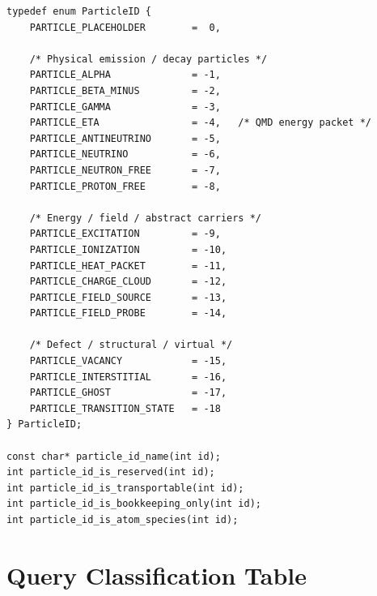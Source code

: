 \documentclass[11pt,a4paper]{article}
\begin{document}
\begin{lstlisting}[style=clang,
  caption={\texttt{legacy/c\_api/particle\_ids.h} -- updated C enum}]
typedef enum ParticleID {
    PARTICLE_PLACEHOLDER        =  0,

    /* Physical emission / decay particles */
    PARTICLE_ALPHA              = -1,
    PARTICLE_BETA_MINUS         = -2,
    PARTICLE_GAMMA              = -3,
    PARTICLE_ETA                = -4,   /* QMD energy packet */
    PARTICLE_ANTINEUTRINO       = -5,
    PARTICLE_NEUTRINO           = -6,
    PARTICLE_NEUTRON_FREE       = -7,
    PARTICLE_PROTON_FREE        = -8,

    /* Energy / field / abstract carriers */
    PARTICLE_EXCITATION         = -9,
    PARTICLE_IONIZATION         = -10,
    PARTICLE_HEAT_PACKET        = -11,
    PARTICLE_CHARGE_CLOUD       = -12,
    PARTICLE_FIELD_SOURCE       = -13,
    PARTICLE_FIELD_PROBE        = -14,

    /* Defect / structural / virtual */
    PARTICLE_VACANCY            = -15,
    PARTICLE_INTERSTITIAL       = -16,
    PARTICLE_GHOST              = -17,
    PARTICLE_TRANSITION_STATE   = -18
} ParticleID;

const char* particle_id_name(int id);
int particle_id_is_reserved(int id);
int particle_id_is_transportable(int id);
int particle_id_is_bookkeeping_only(int id);
int particle_id_is_atom_species(int id);
\end{lstlisting}

\section{Query Classification Table}
\end{document}
